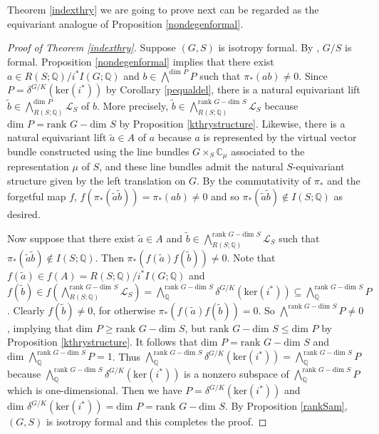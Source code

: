 \documentclass[11pt]{amsart}
\theoremstyle{plain}
\theoremstyle{definition}
\begin{document}
	Theorem \ref{indexthry} we are going to prove next can be regarded as the equivariant analogue of Proposition \ref{nondegenformal}.
	\begin{proof}[Proof of Theorem \ref{indexthry}] Suppose $(G, S)$ is isotropy formal. By \cite[Theorem A]{CFok}, $G/S$ is formal. Proposition \ref{nondegenformal} implies that there exist $a\in R(S; \mathbb{Q})/i^* I(G; \mathbb{Q})$ and $b\in \bigwedge\nolimits^{\text{dim }P}P$ such that $\pi_*(ab)\neq 0$. Since $P=\delta^{G/K}(\text{ker}(i^*))$ by Corollary \ref{pequaldel}, there is a natural equivariant lift $\widetilde{b}\in \bigwedge\nolimits^{\text{dim }P}_{R(S; \mathbb{Q})}\mathcal{L}_S$ of $b$. More precisely, $\widetilde{b}\in \bigwedge\nolimits^{\text{rank }G-\text{dim }S}_{R(S; \mathbb{Q})}\mathcal{L}_S$ because $\text{dim }P=\text{rank }G-\text{dim }S$ by Proposition \ref{kthrystructure}. Likewise, there is a natural equivariant lift $\widetilde{a}\in A$ of $a$ because $a$ is represented by the virtual vector bundle constructed using the line bundles $G\times_S\mathbb{C}_\mu$ associated to the representation $\mu$ of $S$, and these line bundles admit the natural $S$-equivariant structure given by the left translation on $G$. By the commutativity of $\pi_*$ and the forgetful map $f$, $f(\pi_*(\widetilde{a}\widetilde{b}))=\pi_*(ab)\neq 0$ and so $\pi_*(\widetilde{a}\widetilde{b})\notin I(S; \mathbb{Q})$ as desired.
	
	Now suppose that there exist $\widetilde{a}\in A$ and $\widetilde{b}\in\bigwedge\nolimits^{\text{rank }G-\text{dim }S}_{R(S; \mathbb{Q})}\mathcal{L}_S$ such that $\pi_*(\widetilde{a}\widetilde{b})\notin I(S; \mathbb{Q})$. Then $\pi_*(f(\widetilde{a})f(\widetilde{b}))\neq 0$. Note that $f(\widetilde{a})\in f(A)=R(S; \mathbb{Q})/i^*I(G; \mathbb{Q})$ and $f(\widetilde{b})\in f(\bigwedge\nolimits^{\text{rank }G-\text{dim }S}_{R(S; \mathbb{Q})}\mathcal{L}_S)=\bigwedge\nolimits^{\text{rank }G-\text{dim }S}_\mathbb{Q}\delta^{G/K}(\text{ker}(i^*))\subseteq \bigwedge\nolimits^{\text{rank }G-\text{dim }S}_\mathbb{Q}P$. Clearly $f(\widetilde{b})\neq 0$, for otherwise $\pi_*(f(\widetilde{a})f(\widetilde{b}))=0$. So $\bigwedge\nolimits^{\text{rank }G-\text{dim }S}P\neq 0$, implying that $\text{dim }P\geq \text{rank }G-\text{dim }S$, but $\text{rank }G-\text{dim }S\leq \text{dim }P$ by Proposition \ref{kthrystructure}. It follows that $\text{dim }P=\text{rank }G-\text{dim }S$ and $\text{dim }\bigwedge\nolimits_\mathbb{Q}^{\text{rank }G-\text{dim }S}P=1$. Thus $\bigwedge\nolimits_\mathbb{Q}^{\text{rank }G-\text{dim }S}\delta^{G/K}(\text{ker}(i^*))=\bigwedge\nolimits_\mathbb{Q}^{\text{rank }G-\text{dim }S}P$ because $\bigwedge\nolimits_\mathbb{Q}^{\text{rank }G-\text{dim }S}\delta^{G/K}(\text{ker}(i^*))$ is a nonzero subspace of $\bigwedge\nolimits^{\text{rank }G-\text{dim }S}_\mathbb{Q}P$ which is one-dimensional. Then we have $P=\delta^{G/K}(\text{ker}(i^*))$ and $\text{dim }\delta^{G/K}(\text{ker}(i^*))=\text{dim }P=\text{rank }G-\text{dim }S$. By Proposition \ref{rankSam}, $(G, S)$ is isotropy formal and this completes the proof.
	\end{proof}
\end{document}

